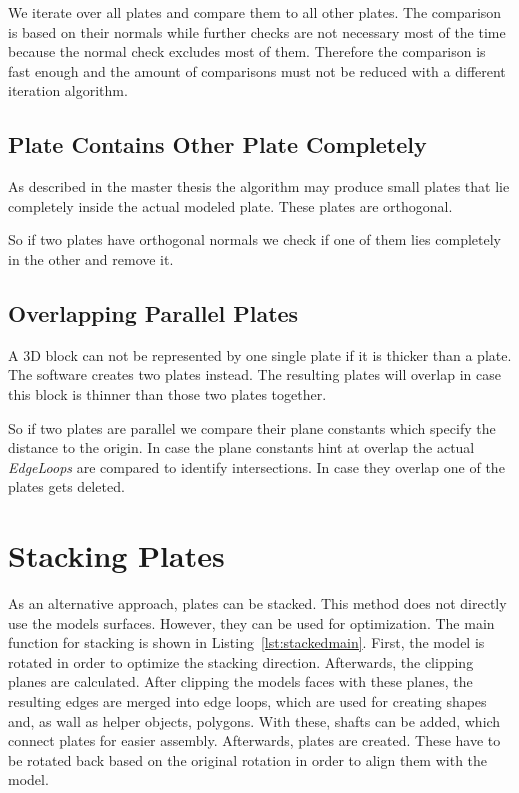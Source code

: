 \documentclass[../ClassicThesis.tex]{subfiles}
\begin{document}
We iterate over all plates and compare them to all other plates. The comparison is based on their normals while further checks are not necessary most of the time because the normal check excludes most of them. Therefore the comparison is fast enough and the amount of comparisons must not be reduced with a different iteration algorithm.

\subsection{Plate Contains Other Plate Completely}

As described in the master thesis the algorithm may produce small plates that lie completely inside the actual modeled plate. These plates are orthogonal.

So if two plates have orthogonal normals we check if one of them lies completely in the other and remove it.


\subsection{Overlapping Parallel Plates}

A 3D block can not be represented by one single plate if it is thicker than a plate. The software creates two plates instead. The resulting plates will overlap in case this block is thinner than those two plates together.

So if two plates are parallel we compare their plane constants which specify the distance to the origin. In case the plane constants hint at overlap the actual \emph{EdgeLoops} are compared to identify intersections. In case they overlap one of the plates gets deleted.






\section{Stacking Plates}\label{sec:stackedplates}

As an alternative approach, plates can be stacked. This method does not directly use the models surfaces. However, they can be used for optimization.
The main function for stacking is shown in Listing~\ref{lst:stackedmain}. First, the model is rotated in order to optimize the stacking direction. Afterwards, the clipping planes are calculated. After clipping the models faces with these planes, the resulting edges are merged into edge loops, which are used for creating shapes and, as wall as helper objects, polygons. With these, shafts can be added, which connect plates for easier assembly. Afterwards, plates are created. These have to be rotated back based on the original rotation in order to align them with the model. 
\end{document}
